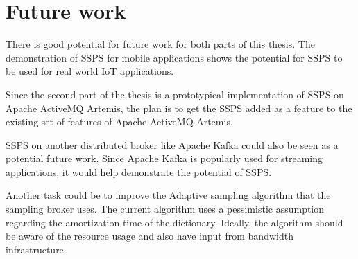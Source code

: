 \chapter{Future work}\label{chapter:future}

There is good potential for future work for both parts of this thesis. The demonstration of SSPS for mobile applications shows the potential for SSPS to be used for real world IoT applications. 

Since the second part of the thesis is a prototypical implementation of SSPS on Apache ActiveMQ Artemis, the plan is to get the SSPS added as a feature to the existing set of features of Apache ActiveMQ Artemis. 

SSPS on another distributed broker like Apache Kafka could also be seen as a potential future work. Since Apache Kafka is popularly used for streaming applications, it would help demonstrate the potential of SSPS.

Another task could be to improve the Adaptive sampling algorithm that the sampling broker uses. The current algorithm uses a pessimistic assumption regarding the amortization time of the dictionary. Ideally, the algorithm should be aware of the resource usage and also have input from bandwidth infrastructure.

